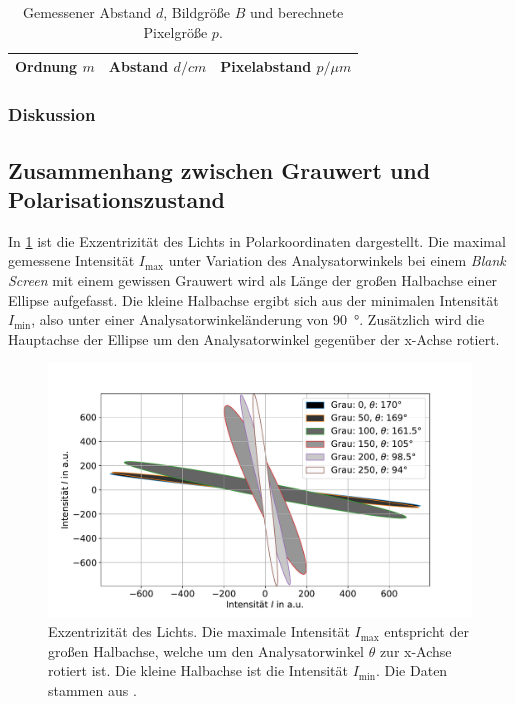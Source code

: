 \documentclass[
	a4paper,
	12pt,
	pagesize,
	ngerman
]{scrartcl}
\begin{document}
\begin{table}[H]
		\centering
		\begin{tabular}{ c | c | c }
			 Ordnung $m$ & Abstand $d/\si{cm}$ & Pixelabstand $p/\si{\mu m}$ \\ \hline
			 
		\end{tabular}
		\caption{
		Gemessener Abstand $d$, Bildgröße $B$ und berechnete Pixelgröße $p$.
		}
		\label{tb_gitter}
\end{table}
			\subsubsection*{Diskussion}

		\subsection{Zusammenhang zwischen Grauwert und Polarisationszustand}
		In \cref{fig_ellipse} ist die Exzentrizität des Lichts in Polarkoordinaten dargestellt.
		Die maximal gemessene Intensität $I_\text{max}$ unter Variation des Analysatorwinkels bei einem \textit{Blank Screen} mit einem gewissen Grauwert wird als Länge der großen Halbachse einer Ellipse aufgefasst.
		Die kleine Halbachse ergibt sich aus der minimalen Intensität $I_\text{min}$, also unter einer Analysatorwinkeländerung von \SI{90}{\degree}.
		Zusätzlich wird die Hauptachse der Ellipse um den Analysatorwinkel gegenüber der x-Achse rotiert.


\begin{figure}[H]
			\includegraphics[width=1\linewidth]{img/ellipse}
			\caption{
			Exzentrizität des Lichts.
			Die maximale Intensität $I_\text{max}$ entspricht der großen Halbachse, welche um den Analysatorwinkel $\theta$ zur x-Achse rotiert ist.
			Die kleine Halbachse ist die Intensität $I_\text{min}$.
			Die Daten stammen aus \cite{JTZ}.
			}
			\label{fig_ellipse}
	\end{figure}
\end{document}
